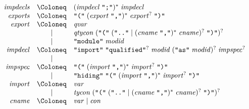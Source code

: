 \begin{align*}
  \begin{array}{rcl}
    \mathit{impdecls}
    & \Coloneq & (\mathit{impdecl}\; \text{\texttt{\textquotedbl;\textquotedbl}})^*\; \mathit{impdecl}
    \\
    \mathit{exports}
    & \Coloneq & \text{\texttt{\textquotedbl(\textquotedbl}}\; (\mathit{export}\; \text{\texttt{\textquotedbl,\textquotedbl}})^*\; \mathit{export}^?\; \text{\texttt{\textquotedbl)\textquotedbl}} \\
    \mathit{export}
    & \Coloneq & \mathit{qvar} \\
    & \mid & \mathit{qtycon}\; (\text{\texttt{\textquotedbl(\textquotedbl}}\; (\text{\texttt{\textquotedbl..\textquotedbl}} \mid (\mathit{cname}\; \text{\texttt{\textquotedbl,\textquotedbl}})^*\; \mathit{cname})^?\; \text{\texttt{\textquotedbl)\textquotedbl}})^? \\
    & \mid & \text{\texttt{\textquotedbl module\textquotedbl}}\; \mathit{modid} \\
    \mathit{impdecl}
    & \Coloneq & \text{\texttt{\textquotedbl import\textquotedbl}}\; \text{\texttt{\textquotedbl qualified\textquotedbl}}^?\; \mathit{modid}\; (\text{\texttt{\textquotedbl as\textquotedbl}}\; \mathit{modid})^?\; \mathit{impspec}^? \\
    & \mid & \\
    \mathit{impspec}
    & \Coloneq & \text{\texttt{\textquotedbl(\textquotedbl}}\; (\mathit{import}\; \text{\texttt{\textquotedbl,\textquotedbl}})^*\; \mathit{import}^?\; \text{\texttt{\textquotedbl)\textquotedbl}} \\
    & \mid & \text{\texttt{\textquotedbl hiding\textquotedbl}}\;\text{\texttt{\textquotedbl(\textquotedbl}}\; (\mathit{import}\; \text{\texttt{\textquotedbl,\textquotedbl}})^*\; \mathit{import}^?\; \text{\texttt{\textquotedbl)\textquotedbl}} \\
    \mathit{import}
    & \Coloneq & \mathit{var} \\
    & \mid & \mathit{tycon}\; (\text{\texttt{\textquotedbl(\textquotedbl}}\; (\text{\texttt{\textquotedbl..\textquotedbl}} \mid (\mathit{cname}\; \text{\texttt{\textquotedbl,\textquotedbl}})^*\; \mathit{cname})^?\; \text{\texttt{\textquotedbl)\textquotedbl}})^? \\
    \mathit{cname}
    & \Coloneq & \mathit{var} \mid \mathit{con}
  \end{array}
\end{align*}

